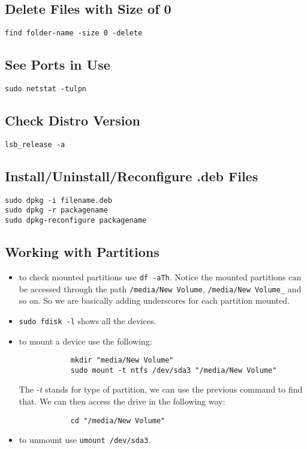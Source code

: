 \documentclass[a4paper, 12pt]{article}
\begin{document}
\subsection{Delete Files with Size of 0}
\verb|find folder-name -size 0 -delete|
\subsection{See Ports in Use}
\verb|sudo netstat -tulpn|
\subsection{Check Distro Version}
\verb|lsb_release -a|
\subsection{Install/Uninstall/Reconfigure .deb Files}
\begin{verbatim}
sudo dpkg -i filename.deb
sudo dpkg -r packagename
sudo dpkg-reconfigure packagename
\end{verbatim}
\subsection{Working with Partitions}
\begin{itemize}
	\item to check mounted partitions use \verb|df -aTh|. Notice the mounted partitions can be accessed through the path \verb|/media/New Volume|, \verb|/media/New Volume_| and so on. So we are basically adding underscores for each partition mounted.
	\item \verb|sudo fdisk -l| shows all the devices.
	\item to mount a device use the following:
		\begin{verbatim}
			mkdir "media/New Volume"
			sudo mount -t ntfs /dev/sda3 "/media/New Volume"
		\end{verbatim}
		The \emph{-t} stands for type of partition, we can use the previous command to find that. We can then access the drive in the following way:
		\begin{verbatim}
			cd "/media/New Volume"
		\end{verbatim}
	\item to unmount use \verb|umount /dev/sda3|.
\end{itemize}
\end{document}
